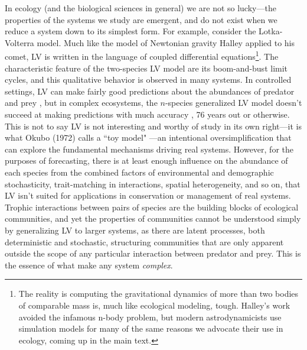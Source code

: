 \documentclass[]{article}
\begin{document}
 In ecology (and the biological sciences in general) we are not so lucky---the properties of the systems we study are emergent, and do not exist when we reduce a system down to its simplest form.
For example, consider the Lotka-Volterra model.
Much like the model of Newtonian gravity Halley applied to his comet, LV is written in the
language of coupled differential equations\footnote{The reality is computing the gravitational dynamics of more than two bodies of comparable mass is, much like ecological modeling, tough. Halley's work avoided the infamous n-body problem, but modern astrodynamicists use simulation models for many of the same reasons we advocate their use in ecology, coming up in the main text.}.
The characteristic feature of the two-species LV model are its boom-and-bust limit cycles, and this qualitative behavior is observed in many systems.
In controlled settings, LV can make fairly good predictions about the abundances of predator and prey \cite{varon_bacterial_1978, fussmann_crossing_2000}, but in complex ecosystems, the \(n\)-species generalized LV model doesn't succeed at making predictions with much accuracy \cite{momeni_lotka-volterra_2017}, 76 years out or otherwise.
This is not to say LV is not interesting and worthy of study in its own right---it is what Okubo (1972) calls a ``toy model" \cite{okubo_diffusion_2001}---an intentional oversimplification that can explore the fundamental mechanisms driving real systems.
However, for the purposes of forecasting, there is at least enough influence on the abundance of each species from the combined factors of environmental and demographic stochasticity, trait-matching in interactions, spatial heterogeneity, and so on, that LV isn't suited for applications in conservation or management of real systems.
Trophic interactions between pairs of species are the building blocks of ecological communities, and yet the properties of communities cannot be understood simply by generalizing LV to larger systems, as there are latent processes, both deterministic and stochastic, structuring communities that are only apparent outside the scope of any particular interaction between predator and prey. This is the essence of what make any system \emph{complex}.
\end{document}
